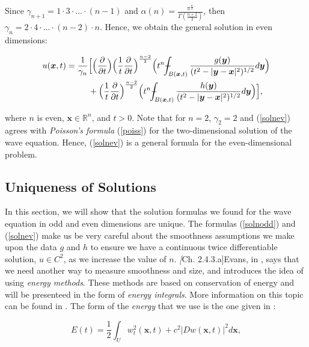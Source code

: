 \documentclass[a4paper, 12pt]{article}
\def\Xint#1{\mathchoice
{\XXint\displaystyle\textstyle{#1}}%
{\XXint\textstyle\scriptstyle{#1}}%
{\XXint\scriptstyle\scriptscriptstyle{#1}}%
{\XXint\scriptscriptstyle\scriptscriptstyle{#1}}%
\!\int}
\def\XXint#1#2#3{{\setbox0=\hbox{$#1{#2#3}{\int}$ }
\vcenter{\hbox{$#2#3$ }}\kern-.6\wd0}}
\def\dashint{\Xint-}
\numberwithin{equation}{section}
\begin{document}
Since $\gamma_{n+1}=1 \cdot 3 \cdot ... \cdot (n-1)$ and
$\alpha(n)=\frac{\pi^{\frac{n}{2}}}{\Gamma(\frac{n+2}{2})}$, then $\gamma_n=2
\cdot 4 \cdot ... \cdot(n-2) \cdot n$. Hence, we obtain the general solution in
even dimensions:

\begin{equation} \label{solnev}
    \begin{split}
        u(\boldsymbol{x}, t)= \frac{1}{\gamma_n} &\Big[ \Big(\diffp[1]{}{t}\Big) \Big(\frac{1}{t} \diffp[1]{}{t}\Big)^{\frac{n-2}{2}}\Big(t^n \dashint_{B(\boldsymbol{x}, t)} \frac{g(\boldsymbol{y})}{(t^2-|\boldsymbol{y}-\boldsymbol{x}|^2)^{1/2}} d \boldsymbol{y} \Big)\\
        & +\Big(\frac{1}{t} \diffp[1]{}{t}\Big)^{\frac{n-2}{2}}\Big(t^n \dashint_{B(\boldsymbol{x},t)} \frac{h(\boldsymbol{y})}{(t^2-|\boldsymbol{y}-\boldsymbol{x}|^2)^{1/2}} d \boldsymbol{y} \Big) \Big],
    \end{split}
\end{equation}

where $n$ is even, $\boldsymbol{x}\in \mathbb{R}^n$, and $t>0$. Note that for
$n=2$, $\gamma_2 = 2$ and (\ref{solnev}) agrees with \emph{Poisson's formula}
(\ref{poiss}) for the two-dimensional solution of the wave equation. Hence,
(\ref{solnev}) is a general formula for the even-dimensional problem.


\subsection{Uniqueness of Solutions}
In this section, we will show that the solution formulas we found for the wave
equation in odd and even dimensions are unique. The formulas (\ref{solnodd}) and
(\ref{solnev}) make us be very careful about the smoothness assumptions we make
upon the data $g$ and $h$ to ensure we have a continuous twice differentiable
solution, $u \in C^2$, as we increase the value of $n$. \emph[Ch. 2.4.3.a]{Evans}, in
\cite{Ev}, says that we need another way to measure smoothness and size, and
introduces the idea of using \emph{energy methods}. These methods are based on
conservation of energy and will be presenteed in the form of \emph{energy
integrals}. More information on this topic can be found in \cite[Chapter VI,
Section 6]{Hil}. The form of the \emph{energy} that we use is the one given in
\cite[Ch. 2.4.3.a, Th. 5]{Ev}:

\begin{equation} \label{energy}
    E(t)=\frac{1}{2}\int_U w_t^2(\boldsymbol{x}, t)+c^2|Dw(\boldsymbol{x}, t)|^2d\boldsymbol{x},
\end{equation}
\end{document}

